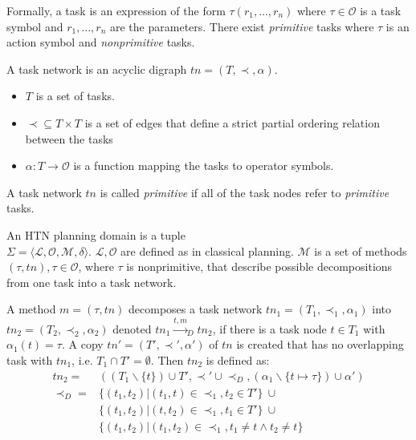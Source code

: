 
Formally, a task is an expression of the form $\tau(r_1,\dots,r_n)$ where $\tau \in \mathcal{O}$ is a task symbol and $r_1,\dots,r_n$ are the parameters.
There exist \textit{primitive} tasks where $\tau$ is an action symbol and \textit{nonprimitive} tasks.

\begin{definition}
  A task network is an acyclic digraph $tn = (T,\prec,\alpha)$.
  \begin{itemize}
    \item $T$ is a set of tasks.
    \item $\prec \subseteq T \times T$ is a set of edges that define a strict partial ordering relation between the tasks
    \item $\alpha: T \rightarrow \mathcal{O}$ is a function mapping the tasks to operator symbols.
  \end{itemize}
\end{definition}

A task network $tn$ is called \textit{primitive} if all of the task nodes refer to \textit{primitive} tasks. 

\begin{definition}
  An \ac{HTN} planning domain is a tuple \\ $\Sigma=\langle \mathcal{L}, \mathcal{O}, \mathcal{M}, \delta \rangle$.
  $\mathcal{L},\mathcal{O}$ are defined as in classical planning. 
  $\mathcal{M}$ is a set of methods $(\tau,tn), \tau \in \mathcal{O}$, where $\tau$ is \textnormal{nonprimitive}, that describe possible decompositions from one task into a task network.
\end{definition}


\begin{definition}
  A method $m = (\tau,tn)$ decomposes a task network $tn_1 = (T_1,\prec_1,\alpha_1)$ into $tn_2 = (T_2,\prec_2,\alpha_2)$ denoted $tn_1 \xrightarrow{t,m}_D tn_2$, if there is a task node $t \in T_1$ with $\alpha_1(t) = \tau$.
  A copy $tn' = (T',\prec',\alpha')$ of $tn$ is created that has no overlapping task with $tn_1$, i.e. $T_1 \cap T' = \emptyset$.
  Then $tn_2$ is defined as:
  \begin{align*}
    tn_2 = & ((T_1 \backslash  \{t\}) \cup T', \prec' \cup \prec_D, (\alpha_1 \backslash \{t \mapsto \tau\}) \cup \alpha') \\
    \prec_D = & \{(t_1, t_2) | (t_1, t) \in \prec_1, t_2 \in T'\}~ \cup \\
    & \{(t_1, t_2) | (t, t_2) \in \prec_1, t_1 \in T '\}~ \cup \\
    & \{(t_1, t_2) | (t_1, t_2) \in \prec_1, t_1 \neq t \land t_2 \neq t\}\\
  \end{align*}
  \label{def:htn-task-dec}
\end{definition}

